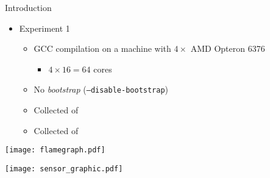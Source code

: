 \begin{frame}{Introduction}
    \begin{itemize}
        \item Experiment 1
        \begin{itemize}
            \item GCC compilation on a machine with $4\times$ AMD Opteron 6376
                \begin{itemize}
                    \item $4 \times 16 = 64$ cores
                \end{itemize}
            \item No \textit{bootstrap} (\texttt{--disable-bootstrap})
            \item Collected {\color{blue}{Compilation Time}} of {\color{red}{each file}}
            \item Collected {\color{blue}{Consumed Energy}} of {\color{red}{all CPUs}}
        \end{itemize}
    \end{itemize}
\end{frame}

\begin{frame}
    \texttt{[image: flamegraph.pdf]}
    \label{fig:analysis_classical}
\end{frame}

\begin{frame}
    \centering
    \texttt{[image: sensor\_graphic.pdf]}
    \label{fig:sensor_graphic}
\end{frame}



